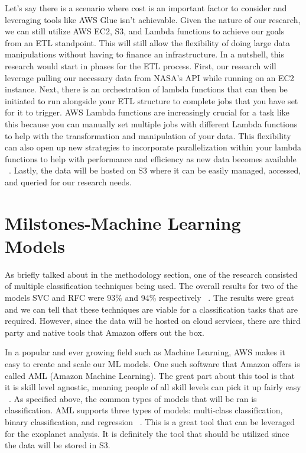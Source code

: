 \documentclass[letterpaper, 10 pt, conference]{ieeeconf}  %
\begin{document}
Let’s say there is a scenario where cost is an important factor to consider and leveraging tools like AWS Glue isn’t achievable. Given the nature of our research, we can still utilize AWS EC2, S3, and Lambda functions to achieve our goals from an ETL standpoint. This will still allow the flexibility of doing large data manipulations without having to finance an infrastructure. In a nutshell, this research would start in phases for the ETL process. First, our research will leverage pulling our necessary data from NASA's API while running on an EC2 instance. Next, there is an orchestration of lambda functions that can then be initiated to run alongside your ETL structure to complete jobs that you have set for it to trigger. AWS Lambda functions are increasingly crucial for a task like this because you can manually set multiple jobs with different Lambda functions to help with the transformation and manipulation of your data. This flexibility can also open up new strategies to incorporate parallelization within your lambda functions to help with performance and efficiency as new data becomes available ~\cite{AmazonLambda}. Lastly, the data will be hosted on S3 where it can be easily managed, accessed, and queried for our research needs.

\section{Milstones-Machine Learning Models}

As briefly talked about in the methodology section, one of the research consisted of multiple classification techniques being used. The overall results for two of the models SVC and RFC were 93\% and 94\% respectively ~\cite{MLApproachesExoPlanets}. The results were great and we can tell that these techniques are viable for a classification tasks that are required. However, since the data will be hosted on cloud services, there are third party and native tools that Amazon offers out the box.

In a popular and ever growing field such as Machine Learning, AWS makes it easy to create and scale our ML models. One such software that Amazon offers is called AML (Amazon Machine Learning). The great part about this tool is that it is skill level agnostic, meaning people of all skill levels can pick it up fairly easy ~\cite{PopularMLSoftware}. As specified above, the common types of models that will be ran is classification. AML supports three types of models: multi-class classification, binary classification, and regression ~\cite{PopularMLSoftware}. This is a great tool that can be leveraged for the exoplanet analysis. It is definitely the tool that should be utilized since the data will be stored in S3.
\end{document}
